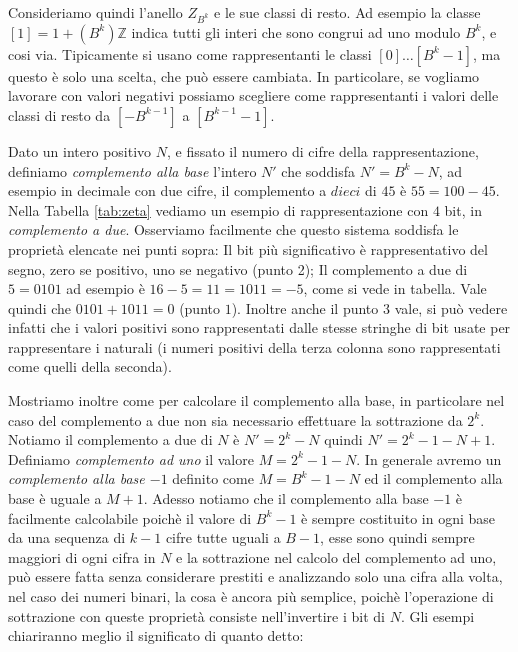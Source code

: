 Consideriamo quindi l'anello $Z_{B^k}$ e le sue classi di resto. Ad esempio la
classe $[1] = 1 + (B^k)\mathbb{Z}$ indica tutti gli interi che sono congrui ad
uno modulo $B^k$, e cosi via. Tipicamente si usano come rappresentanti le classi $[0] \ldots [B^k-1]$, ma questo è solo una scelta, che può
essere cambiata. In particolare, se vogliamo lavorare con valori negativi
possiamo scegliere come rappresentanti i valori delle classi di resto da $[-B^{k-1}]$ a $[B^{k-1}-1]$.

Dato un intero positivo $N$, e fissato il numero di cifre della
rappresentazione, definiamo \emph{complemento alla base} l'intero $N'$ che
soddisfa $N'= B^k-N$, ad esempio in decimale con due cifre, il complemento a
$dieci$ di $45$ è $55 = 100-45$. Nella Tabella \ref{tab:zeta} vediamo un
esempio di rappresentazione con $4$ bit, in \emph{complemento a due}.
Osserviamo facilmente che questo sistema soddisfa le proprietà elencate nei
punti sopra: Il bit più significativo è rappresentativo del segno, zero se
positivo, uno se negativo (punto 2); Il complemento a due di $5 = 0101$ ad
esempio è $16-5 = 11 = 1011 = -5$, come si vede in tabella. Vale quindi che
$0101+1011 = 0$ (punto $1$). Inoltre anche il punto $3$ vale, si può vedere
infatti che i valori positivi sono rappresentati dalle stesse stringhe di bit
usate per rappresentare i naturali (i numeri positivi della terza colonna sono
rappresentati come quelli della seconda).

Mostriamo inoltre come per calcolare il complemento alla base, in particolare
nel caso del complemento a due non sia necessario effettuare la sottrazione da
$2^k$. Notiamo il complemento a due di $N$ è $N' = 2^k - N$ quindi $N' =
2^k-1-N+1$. Definiamo \emph{complemento ad uno} il valore $M = 2^k-1-N$. In
generale avremo un \emph{complemento alla base $-1$} definito come $M =
B^k-1-N$ ed il complemento alla base è uguale a $M+1$. Adesso notiamo che il
complemento alla base $-1$ è facilmente calcolabile poichè il valore di $B^k-1$
è sempre costituito in ogni base da una sequenza di $k-1$ cifre tutte uguali a
$B-1$, esse sono quindi sempre maggiori di ogni cifra in $N$ e la sottrazione
nel calcolo del complemento ad uno, può essere fatta senza considerare prestiti
e analizzando solo una cifra alla volta, nel caso dei numeri binari, la cosa è
ancora più semplice, poichè l'operazione di sottrazione con queste proprietà
consiste nell'invertire i bit di $N$. Gli esempi chiariranno meglio il
significato di quanto detto:


